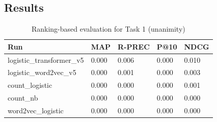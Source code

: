\documentclass[]{style/ceurart}
\begin{document}
\subsection{Results}




\begin{table}[]
\caption{Ranking-based evaluation for Task 1 (unanimity)}
\begin{tabular}{lllll}
\toprule
 Run                       & MAP   & R-PREC & P@10 & NDCG  \\
\midrule
 logistic\_transformer\_v5 & 0.000 & 0.006  & 0.000                             & 0.010 \\
 logistic\_word2vec\_v5    & 0.000 & 0.001  & 0.000                             & 0.003 \\
 count\_logistic           & 0.000 & 0.000  & 0.000                             & 0.001 \\
 count\_nb                 & 0.000 & 0.000  & 0.000                             & 0.000 \\
 word2vec\_logistic        & 0.000 & 0.000  & 0.000                             & 0.000 \\
 \bottomrule
\end{tabular}
\end{table}
\end{document}
